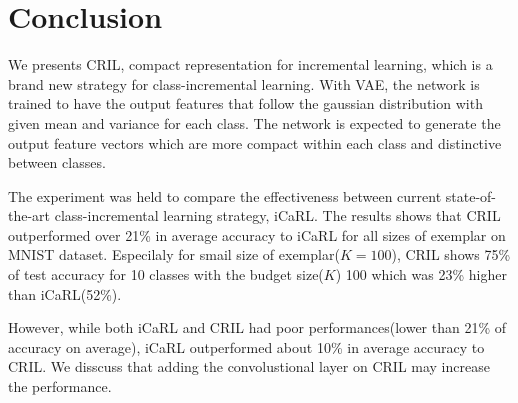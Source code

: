 \section{Conclusion}
\label{sec:conclusion}

We presents CRIL, compact representation for incremental learning, which is a brand new strategy for class-incremental learning. With VAE, the network is trained to have the output features that follow the gaussian distribution with given mean and variance for each class. The network is expected to generate the output feature vectors which are more compact within each class and distinctive between classes.

The experiment was held to compare the effectiveness between current state-of-the-art class-incremental learning strategy, iCaRL. The results shows that CRIL outperformed over 21\% in average accuracy to iCaRL for all sizes of exemplar on MNIST dataset. Especilaly for smail size of exemplar($K=100$), CRIL shows 75\% of test accuracy for 10 classes with the budget size($K$) 100 which was 23\% higher than iCaRL(52\%).

However, while both iCaRL and CRIL had poor performances(lower than 21\% of accuracy on average), iCaRL outperformed about 10\% in average accuracy to CRIL. We disscuss that adding the convolustional layer on CRIL may increase the performance.


